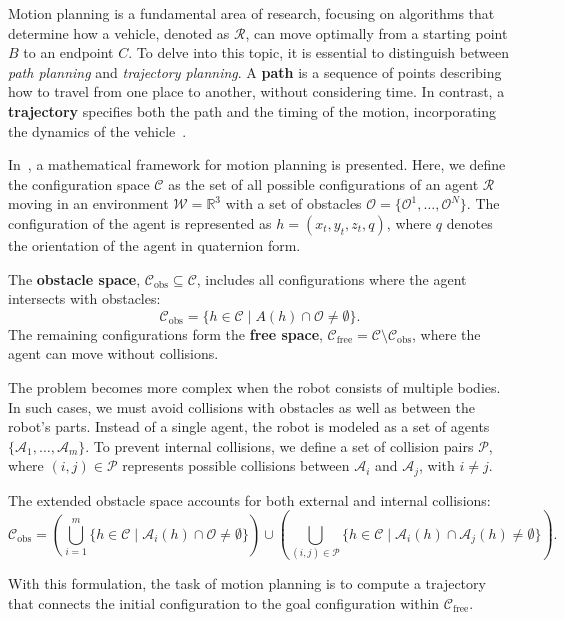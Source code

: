 Motion planning is a fundamental area of research, focusing on algorithms that determine how a vehicle, denoted as $\mathcal{R}$, can move optimally from a starting point $B$ to an endpoint $C$. To delve into this topic, it is essential to distinguish between \textit{path planning} and \textit{trajectory planning}. A \textbf{path} is a sequence of points describing how to travel from one place to another, without considering time. In contrast, a \textbf{trajectory} specifies both the path and the timing of the motion, incorporating the dynamics of the vehicle~\cite{wolek2017model}.

In~\cite{lavalle2006planning}, a mathematical framework for motion planning is presented. Here, we define the configuration space $\mathcal{C}$ as the set of all possible configurations of an agent $\mathcal{R}$ moving in an environment $\mathcal{W} = \mathbb{R}^3$ with a set of obstacles $\mathcal{O} = \{\mathcal{O}^1, \dots, \mathcal{O}^N\}$. The configuration of the agent is represented as $h = (x_t, y_t, z_t, q)$, where $q$ denotes the orientation of the agent in quaternion form.

The \textbf{obstacle space}, $\mathcal{C}_{\text{obs}} \subseteq \mathcal{C}$, includes all configurations where the agent intersects with obstacles:
\[
\mathcal{C}_{\text{obs}} = \{ h \in \mathcal{C} \mid A(h) \cap \mathcal{O} \neq \emptyset \}.
\]
The remaining configurations form the \textbf{free space}, $\mathcal{C}_{\text{free}} = \mathcal{C} \setminus \mathcal{C}_{\text{obs}}$, where the agent can move without collisions.

The problem becomes more complex when the robot consists of multiple bodies. In such cases, we must avoid collisions with obstacles as well as between the robot's parts. Instead of a single agent, the robot is modeled as a set of agents $\{\mathcal{A}_1, \dots, \mathcal{A}_m\}$. To prevent internal collisions, we define a set of collision pairs $\mathcal{P}$, where $(i, j) \in \mathcal{P}$ represents possible collisions between $\mathcal{A}_i$ and $\mathcal{A}_j$, with $i \neq j$.

The extended obstacle space accounts for both external and internal collisions:
\[
\mathcal{C}_{\text{obs}} = \left( \bigcup_{i=1}^m \{h \in \mathcal{C} \mid \mathcal{A}_i(h) \cap \mathcal{O} \neq \emptyset\} \right) \cup \left( \bigcup_{(i, j) \in \mathcal{P}} \{h \in \mathcal{C} \mid \mathcal{A}_i(h) \cap \mathcal{A}_j(h) \neq \emptyset\} \right).
\]

With this formulation, the task of motion planning is to compute a trajectory that connects the initial configuration to the goal configuration within $\mathcal{C}_{\text{free}}$.

